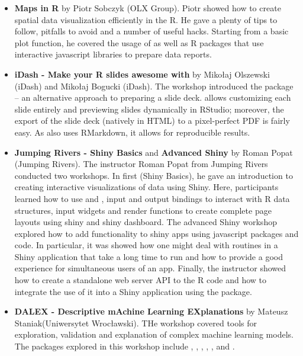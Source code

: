 \begin{itemize}
  \item \textbf{Maps in R} by Piotr Sobczyk (OLX Group). Piotr showed how to create spatial data visualization efficiently in the R. He gave a plenty of tips to follow, pitfalls to avoid and a number of useful hacks. Starting from a basic plot function, he covered the usage of  as well as R packages that use interactive javascript libraries to prepare data reports.
    \item \textbf{iDash - Make your R slides awesome with } by Miko\l{}aj Olszewski (iDash) and Mikołaj Bogucki (iDash). The workshop introduced the  \citep{xie_xaringan:_2018} package -- an alternative approach to preparing a slide deck.  allows customizing each slide entirely and previewing slides dynamically in RStudio; moreover, the export of the slide deck (natively in HTML) to a pixel-perfect PDF is fairly easy. As  also uses RMarkdown, it allows for reproducible results. 
    \item \textbf{Jumping Rivers - Shiny Basics} and \textbf{Advanced Shiny} by Roman Popat (Jumping Rivers). The instructor Roman Popat from Jumping Rivers conducted two workshops. In first (Shiny Basics), he gave an introduction to creating interactive visualizations of data using Shiny. Here, participants learned how to use  and , input and output bindings to interact with R data structures, input widgets and render functions to create complete page layouts using shiny and shiny dashboard. The advanced Shiny workshop explored how to add functionality to shiny apps using javascript packages and code. In particular, it was showed how one might deal with routines in a Shiny application that take a long time to run and how to provide a good experience for simultaneous users of an app. Finally, the instructor showed how to create a standalone web server API to the R code and how to integrate the use of it into a Shiny application using the  \citep{technology_plumber:_2018} package.
    \item \textbf{DALEX - Descriptive mAchine Learning EXplanations} by Mateusz Staniak(Uniwersytet Wroc\l{}awski). THe workshop covered tools for exploration, validation and explanation of complex machine learning models. The packages explored in this workshop include  \citep{mlr},  \citep{biecek_dalex:_2018},  \citep{live},  \citep{FactorMerger},  \citep{archivist},  \citep{pdp} and  \citep{apley_aleplot:_2018}.

\end{itemize}

